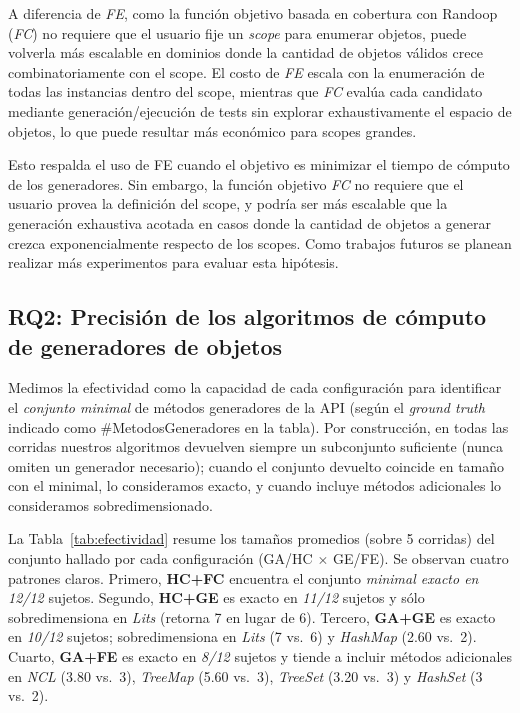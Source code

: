 A diferencia de \emph{FE}, como la función objetivo basada en cobertura con Randoop
(\emph{FC}) no requiere que el usuario fije un \emph{scope} para enumerar
objetos, puede volverla más escalable en dominios donde la cantidad de
objetos válidos crece combinatoriamente con el scope. 
El costo de \emph{FE} escala con la enumeración de todas
las instancias dentro del scope, mientras que \emph{FC} evalúa cada candidato
mediante generación/ejecución de tests sin explorar exhaustivamente el
espacio de objetos, lo que puede resultar más económico para scopes grandes.

Esto respalda el uso de FE cuando el objetivo es minimizar el tiempo de cómputo de los generadores.
Sin embargo, la función objetivo \emph{FC} no requiere que el usuario provea la definición del scope, y
podría ser más escalable que la generación exhaustiva acotada en casos donde
la cantidad de objetos a generar crezca exponencialmente respecto de los scopes. Como trabajos futuros se planean realizar más experimentos 
para evaluar esta hipótesis.



\subsection{RQ2: Precisión de los algoritmos de cómputo de generadores de objetos}
\label{sec:experimentalIdentificacionPrecision}

Medimos la efectividad como la capacidad de cada configuración para identificar
el \emph{conjunto minimal} de métodos generadores de la API (según el
\emph{ground truth} indicado como \#MetodosGeneradores en la tabla). Por construcción, en
todas las corridas nuestros algoritmos devuelven siempre un subconjunto
suficiente (nunca omiten un generador necesario); cuando el conjunto
devuelto coincide en tamaño con el minimal, lo consideramos exacto, y
cuando incluye métodos adicionales lo consideramos sobredimensionado.

La Tabla~\ref{tab:efectividad} resume los tamaños promedios (sobre 5
corridas) del conjunto hallado por cada configuración (GA/HC $\times$ GE/FE).
Se observan cuatro patrones claros. Primero, \textbf{HC+FC} encuentra el conjunto
\emph{minimal exacto en 12/12} sujetos. Segundo, \textbf{HC+GE} es exacto en
\emph{11/12} sujetos y sólo sobredimensiona en \emph{Lits} (retorna 7 en lugar de
6).
Tercero, \textbf{GA+GE} es exacto en \emph{10/12} sujetos; sobredimensiona en
\emph{Lits} (7 vs.\ 6) y \emph{HashMap} (2.60 vs.\ 2). Cuarto, \textbf{GA+FE} es
exacto en \emph{8/12} sujetos y tiende a incluir métodos adicionales en
\emph{NCL} (3.80 vs.\ 3), \emph{TreeMap} (5.60 vs.\ 3), \emph{TreeSet}
(3.20 vs.\ 3) y \emph{HashSet} (3 vs.\ 2).

